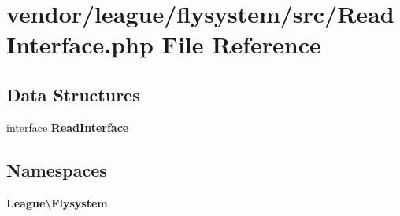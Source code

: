 \section{vendor/league/flysystem/src/\+Read\+Interface.php File Reference}
\label{_read_interface_8php}
\subsection*{Data Structures}
\begin{DoxyCompactItemize}
\item 
interface {\bf Read\+Interface}
\end{DoxyCompactItemize}
\subsection*{Namespaces}
\begin{DoxyCompactItemize}
\item 
 {\bf League\textbackslash{}\+Flysystem}
\end{DoxyCompactItemize}
